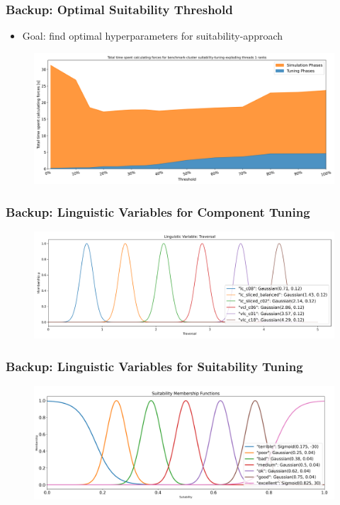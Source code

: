 \documentclass[
	10pt,
	t		%
]{beamer}
\begin{document}
\begin{frame}
	\frametitle{Backup: Optimal Suitability Threshold}
	
	\begin{itemize}
		\item Goal: find optimal hyperparameters for suitability-approach
	\end{itemize}
	
	\begin{figure}
		\centering
		\includegraphics[width=1\textwidth]{figures/suitability-search.png}
	\end{figure}
\end{frame}

\begin{frame}
	\frametitle{Backup: Linguistic Variables for Component Tuning}
	
	\begin{figure}
		\centering
		\includegraphics[width=1\textwidth]{figures/component-linguistic-variable.png}
	\end{figure}
	
\end{frame}

\begin{frame}
	\frametitle{Backup: Linguistic Variables for Suitability Tuning}
	\begin{figure}
		\centering
		\includegraphics[width=1\textwidth]{figures/suitability-linguistic-variable.png}
	\end{figure}
	
\end{frame}
\end{document}
